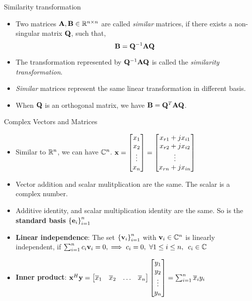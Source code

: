 \documentclass[aspectratio=169]{beamer}
\def\mf{\ensuremath\mathbf}
\def\mb{\ensuremath\mathbb}
\begin{document}
\begin{frame}[t]{Similarity transformation}
\begin{itemize}
    \item Two matrices $\mf{A}, \mf{B} \in \mb{R}^{n \times n}$ are called \textit{similar} matrices, if there exists a non-singular matrix $\mf{Q}$, such that,
    \[ \mf{B} = \mf{Q}^{-1}\mf{A}\mf{Q} \]

    \item The transformation represented by $\mf{Q}^{-1}\mf{A}\mf{Q}$ is called the \textit{similarity transformation}.

    \item \textit{Similar} matrices represent the same linear transformation in different basis.

    \item When $\mf{Q}$ is an orthogonal matrix, we have $\mf{B} = \mf{Q}^T\mf{A}\mf{Q}$. 
\end{itemize}
\end{frame}


\begin{frame}[t]{Complex Vectors and Matrices}
\begin{itemize}
    \item Similar to $\mb{R}^n$, we can have $\mb{C}^n$. $\mf{x} = \begin{bmatrix*}x_{1}\\x_{2}\\\vdots\\x_{n}\end{bmatrix*} = \begin{bmatrix*}x_{r1} + jx_{i1}\\x_{r2} + jx_{i2}\\\vdots\\x_{rn} + jx_{in}\end{bmatrix*}$
    
    \item Vector addition and scalar mulitplication are the same. The scalar is a complex number.
    
    \item Additive identity, and scalar multiplication identity are the same. So is the \textbf{standard basis} $\left\{\mf{e}_i\right\}_{i=1}^{n}$
    
    \item \textbf{Linear independence}: The set $\left\{\mf{v}_i\right\}_{i=1}^n$ with $\mf{v}_i \in \mb{C}^n$ is linearly independent, if  $\sum_{i=1}^nc_i\mf{v}_i = 0, \implies c_i = 0, \,\, \forall 1 \leq i \leq n, \,\,\, c_i \in \mb{C}$
    
    \item \textbf{Inner product}: $\mf{x}^H\mf{y} = \begin{bmatrix*}\overline{x}_1&\overline{x}_2&\ldots&\overline{x}_n\end{bmatrix*}\begin{bmatrix*}y_1\\y_2\\\vdots\\y_n\end{bmatrix*} = \sum_{i=1}^n\overline{x}_iy_i$

\end{itemize}
\end{frame}
\end{document}

